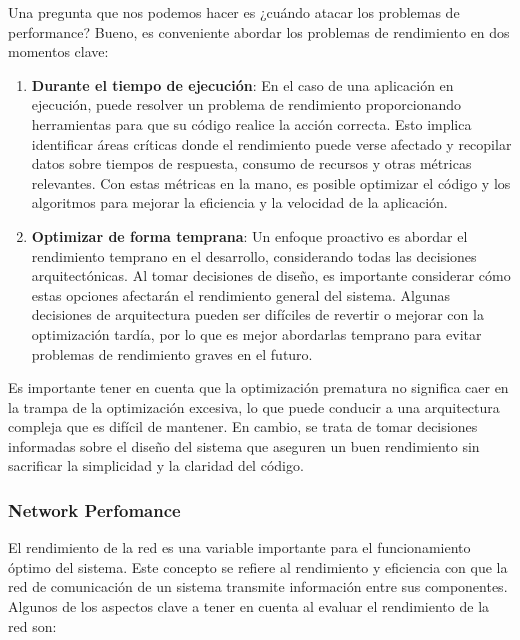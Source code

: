 \documentclass{article}
\begin{document}
		 Una pregunta que nos podemos hacer es ¿cuándo atacar los problemas de performance? Bueno, es conveniente abordar los problemas de rendimiento en dos momentos clave:
		 
		 \begin{enumerate}
		 	\item \textbf{Durante el tiempo de ejecución}: En el caso de una aplicación en ejecución, puede resolver un problema de rendimiento proporcionando herramientas para que su código realice la acción correcta. Esto implica identificar áreas críticas donde el rendimiento puede verse afectado y recopilar datos sobre tiempos de respuesta, consumo de recursos y otras métricas relevantes. Con estas métricas en la mano, es posible optimizar el código y los algoritmos para mejorar la eficiencia y la velocidad de la aplicación.
		 	
		 	\item \textbf{Optimizar de forma temprana}: Un enfoque proactivo es abordar el rendimiento temprano en el desarrollo, considerando todas las decisiones arquitectónicas. Al tomar decisiones de diseño, es importante considerar cómo estas opciones afectarán el rendimiento general del sistema. Algunas decisiones de arquitectura pueden ser difíciles de revertir o mejorar con la optimización tardía, por lo que es mejor abordarlas temprano para evitar problemas de rendimiento graves en el futuro.				 	
		 \end{enumerate}
		 
		 Es importante tener en cuenta que la optimización prematura no significa caer en la trampa de la optimización excesiva, lo que puede conducir a una arquitectura compleja que es difícil de mantener. En cambio, se trata de tomar decisiones informadas sobre el diseño del sistema que aseguren un buen rendimiento sin sacrificar la simplicidad y la claridad del código.
		 
 		\subsubsection{Network Perfomance}
 		El rendimiento de la red es una variable importante para el funcionamiento óptimo del sistema. Este concepto se refiere al rendimiento y eficiencia con que la red de comunicación de un sistema transmite información entre sus componentes. Algunos de los aspectos clave a tener en cuenta al evaluar el rendimiento de la red son:
 		
\end{document}
